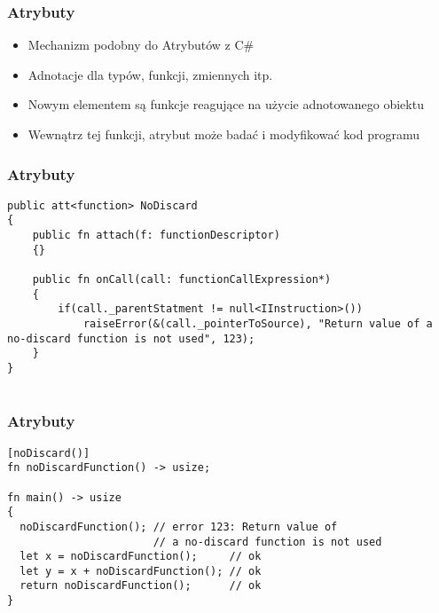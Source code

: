 \begin{frame}
	\frametitle{Atrybuty}

	\begin{itemize}
		\item Mechanizm podobny do Atrybutów z C\#
		\item Adnotacje dla typów, funkcji, zmiennych itp.
		\item Nowym elementem są funkcje reagujące na użycie adnotowanego obiektu
		\item Wewnątrz tej funkcji, atrybut może badać i modyfikować kod programu
	\end{itemize}

\end{frame}

\begin{frame}[fragile]
	\frametitle{Atrybuty}

	\begin{lstlisting}
public att<function> NoDiscard
{
	public fn attach(f: functionDescriptor)
	{}

	public fn onCall(call: functionCallExpression*)
	{
		if(call._parentStatment != null<IInstruction>())
			raiseError(&(call._pointerToSource), "Return value of a no-discard function is not used", 123);
	}
}
		
	\end{lstlisting}

\end{frame}

\begin{frame}[fragile]
	\frametitle{Atrybuty}

	\begin{lstlisting}
[noDiscard()]
fn noDiscardFunction() -> usize;

fn main() -> usize
{
  noDiscardFunction(); // error 123: Return value of
                       // a no-discard function is not used
  let x = noDiscardFunction();     // ok
  let y = x + noDiscardFunction(); // ok
  return noDiscardFunction();      // ok
}
		
	\end{lstlisting}

\end{frame}


